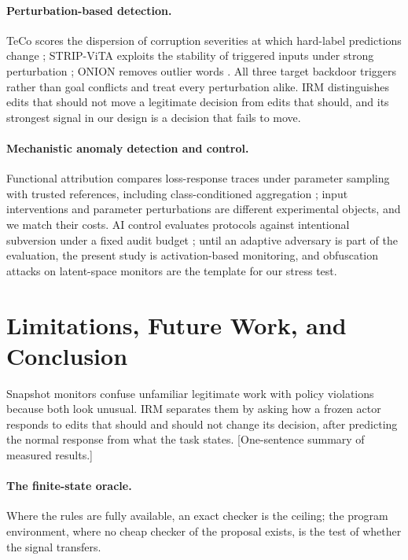 \documentclass[10pt]{article}
\newcommand{\TBD}[1]{\textcolor{BrickRed}{[#1]}}
\newcommand{\method}{\textsc{IRM}}
\begin{document}
\paragraph{Perturbation-based detection.}
TeCo scores the dispersion of corruption severities at which hard-label predictions change
\citep{liu2023teco}; STRIP-ViTA exploits the stability of triggered inputs under strong perturbation
\citep{gao2019stripvita}; ONION removes outlier words \citep{qi2021onion}. All three target backdoor
triggers rather than goal conflicts and treat every perturbation alike. \method{} distinguishes edits
that should not move a legitimate decision from edits that should, and its strongest signal in our
design is a decision that fails to move.

\paragraph{Mechanistic anomaly detection and control.}
Functional attribution compares loss-response traces under parameter sampling with trusted references,
including class-conditioned aggregation \citep{lyonskeenan2026functional}; input interventions and
parameter perturbations are different experimental objects, and we match their costs. AI control
evaluates protocols against intentional subversion under a fixed audit budget
\citep{greenblatt2024control}; until an adaptive adversary is part of the evaluation, the present study
is activation-based monitoring, and obfuscation attacks on latent-space monitors
\citep{bailey2026obfuscated} are the template for our stress test.

\section{Limitations, Future Work, and Conclusion}
\label{sec:conclusion}

Snapshot monitors confuse unfamiliar legitimate work with policy violations because both look unusual.
\method{} separates them by asking how a frozen actor responds to edits that should and should not
change its decision, after predicting the normal response from what the task states. \TBD{One-sentence
summary of measured results.}

\paragraph{The finite-state oracle.}
Where the rules are fully available, an exact checker is the ceiling; the program environment, where
no cheap checker of the proposal exists, is the test of whether the signal transfers.
\end{document}

